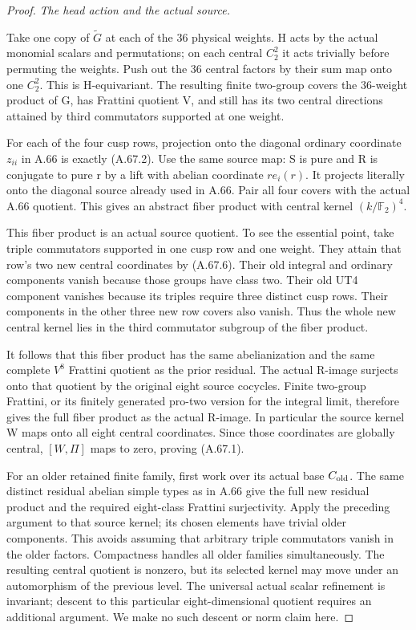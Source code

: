 \begin{proof}
\emph{The head action and the actual source.}\par
Take one copy of \(\widetilde G\) at each of the 36 physical
weights. H acts by the actual monomial scalars and permutations;
on each central \(C_2^2\) it acts trivially before permuting
the weights. Push out the 36 central factors by their sum map
onto one \(C_2^2\). This is H-equivariant. The resulting finite
two-group covers the 36-weight product of G, has Frattini
quotient V, and still has its two central directions attained
by third commutators supported at one weight.

For each of the four cusp rows, projection onto the diagonal
ordinary coordinate \(z_{ii}\) in A.66 is exactly (A.67.2).
Use the same source map: S is pure and R is conjugate to pure r
by a lift with abelian coordinate \(r e_i(r)\). It projects
literally onto the diagonal source already used in A.66.
Pair all four covers with the actual A.66 quotient. This gives
an abstract fiber product with central kernel
\((k/\mathbb F_2)^4\).

This fiber product is an actual source quotient. To see the
essential point, take triple commutators supported in one cusp
row and one weight. They attain that row's two new central
coordinates by (A.67.6). Their old integral and ordinary
components vanish because those groups have class two. Their
old UT4 component vanishes because its triples require three
distinct cusp rows. Their components in the other three new
row covers also vanish. Thus the whole new central kernel lies
in the third commutator subgroup of the fiber product.

It follows that this fiber product has the same abelianization
and the same complete \(V^8\) Frattini quotient as the prior
residual. The actual R-image surjects onto that quotient by the
original eight source cocycles. Finite two-group Frattini, or
its finitely generated pro-two version for the integral limit,
therefore gives the full fiber product as the actual R-image.
In particular the source kernel W maps onto all eight central
coordinates. Since those coordinates are globally central,
\([W,\Pi]\) maps to zero, proving (A.67.1).

For an older retained finite family, first work over its actual
base \(C_{\rm old}\). The same distinct residual abelian simple
types as in A.66 give the full new residual product and the
required eight-class Frattini surjectivity. Apply the preceding
argument to that source kernel; its chosen elements have trivial
older components. This avoids assuming that arbitrary triple
commutators vanish in the older factors. Compactness handles
all older families simultaneously.
The resulting central quotient is nonzero, but its selected
kernel may move under an automorphism of the previous level.
The universal actual scalar refinement is invariant; descent
to this particular eight-dimensional quotient requires an
additional argument. We make no such descent or norm claim here.
\end{proof}


